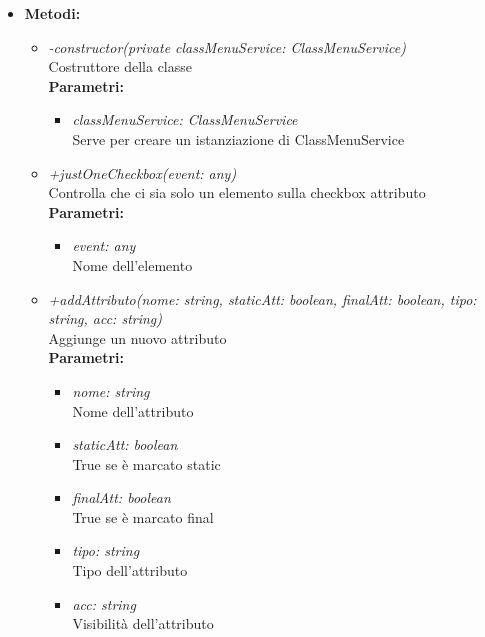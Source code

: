 \begin{itemize}
	\item \textbf{Metodi:}
		\begin{itemize}
			\item \emph{-constructor(private classMenuService: ClassMenuService)}\\
    		Costruttore della classe\\
    		\textbf{Parametri:}
    		\begin{itemize}
    			\item \emph{classMenuService: ClassMenuService}\\
    			Serve per creare un istanziazione di ClassMenuService
    		\end{itemize}
    		\item \emph{+justOneCheckbox(event: any)}\\
    		Controlla che ci sia solo un elemento sulla checkbox attributo\\
    		\textbf{Parametri:}
    		\begin{itemize}
    			\item \emph{event: any}\\
    			Nome dell'elemento
    		\end{itemize}
    		\item \emph{+addAttributo(nome: string, staticAtt: boolean, finalAtt: boolean, tipo: string, acc: string) }\\
    		Aggiunge un nuovo attributo\\
    		\textbf{Parametri:}
    		\begin{itemize}
    			\item \emph{nome: string}\\
    			Nome dell'attributo
    			\item \emph{staticAtt: boolean}\\
    			True se è marcato static
    			\item \emph{finalAtt: boolean}\\
    			True se è marcato final
    			\item \emph{tipo: string}\\
    			Tipo dell'attributo
    			\item \emph{acc: string}\\
    			Visibilità dell'attributo
    		\end{itemize}
		\end{itemize}
\end{itemize}